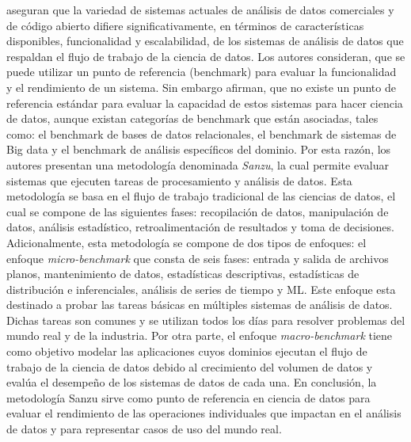 \cite{Watson2017} aseguran que la variedad de sistemas actuales de análisis de datos comerciales y de código abierto difiere significativamente, en términos de características disponibles, funcionalidad y escalabilidad, de los sistemas de análisis de datos que respaldan el flujo de trabajo de la ciencia de datos. Los autores consideran, que se puede utilizar un punto de referencia (benchmark) para evaluar la funcionalidad y el rendimiento de un sistema. Sin embargo afirman, que no existe un punto de referencia estándar para evaluar la capacidad de estos sistemas para hacer ciencia de datos, aunque existan categorías de benchmark que están asociadas, tales como: el benchmark de bases de datos relacionales, el benchmark de sistemas de Big data y el benchmark de análisis específicos del dominio. Por esta razón, los autores presentan una metodología denominada \textit{Sanzu}, la cual permite evaluar sistemas que ejecuten tareas de procesamiento y análisis de datos. Esta metodología se basa en el flujo de trabajo tradicional de las ciencias de datos, el cual se compone de las siguientes fases: recopilación de datos, manipulación de datos, análisis estadístico, retroalimentación  de resultados y toma de decisiones. Adicionalmente, esta metodología se compone de dos tipos de enfoques: el enfoque \textit{micro-benchmark} que consta de seis fases: entrada y salida de archivos planos, mantenimiento de datos, estadísticas descriptivas, estadísticas de distribución e inferenciales, análisis de series de tiempo y ML. Este enfoque esta destinado a probar las tareas básicas en múltiples sistemas de análisis de datos. Dichas tareas son comunes y se utilizan todos los días para resolver problemas del mundo real y de la industria. Por otra parte, el enfoque \textit{macro-benchmark} tiene como objetivo modelar las aplicaciones cuyos dominios ejecutan el flujo de trabajo de la ciencia de datos debido al crecimiento del volumen de datos y evalúa el desempeño de los sistemas de datos de cada una. En conclusión, la metodología Sanzu sirve como punto de referencia en ciencia de datos para evaluar el rendimiento de las operaciones individuales que impactan en el análisis de datos y para representar casos de uso del mundo real.

